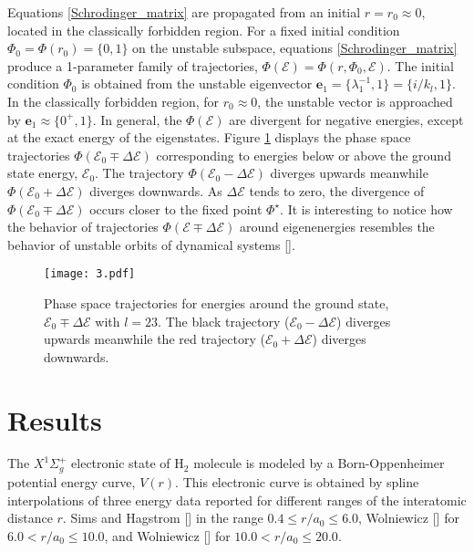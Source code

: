 \documentclass[%
 aip,
 numerical,
 jcp,
 floatfix,
rsi,%
amsmath,amssymb,
reprint,%
author-year%
]{revtex4-1}
\begin{document}
Equations \eqref{Schrodinger_matrix} are propagated from an initial $r=r_0\approx 0$, located in the classically forbidden region. For a fixed initial condition $\Phi_0=\Phi(r_0)=\{0,1\}$ on the unstable subspace, equations \eqref{Schrodinger_matrix} produce a 1-parameter family of trajectories, $\Phi(\mathcal{E})=\Phi(r,\Phi_0,\mathcal{E})$. The initial condition $\Phi_0$ is obtained from the unstable eigenvector $\mathbf{e}_1=\{\lambda_1^{-1},1\}=\{i/k_l,1\}$. In the classically forbidden region, for $r_0\approx 0$, the unstable vector is approached by $\mathbf{e}_1\approx\{0^+,1\}$. In general, the $\Phi(\mathcal{E})$ are divergent for negative energies, except at the exact energy of the eigenstates. Figure \ref{phase_space_divergence} displays the phase space trajectories $\Phi(\mathcal{E}_0\mp\Delta\mathcal{E})$ corresponding to energies below or above the ground state energy, $\mathcal{E}_0$. The trajectory $\Phi(\mathcal{E}_0-\Delta\mathcal{E})$ diverges upwards meanwhile $\Phi(\mathcal{E}_0+\Delta\mathcal{E})$ diverges downwards. As $\Delta\mathcal{E}$ tends to zero, the divergence of $\Phi(\mathcal{E}_0\mp\Delta\mathcal{E})$ occurs closer to the fixed point $\Phi^\star$. It is interesting to notice how the behavior of trajectories $\Phi(\mathcal{E}\mp\Delta\mathcal{E})$ around eigenenergies resembles the behavior of unstable orbits of dynamical systems [].

\begin{figure}[ht!]\centering
	\texttt{[image: 3.pdf]}
	\caption{Phase space trajectories for energies around the ground state, $\mathcal{E}_0\mp\Delta\mathcal{E}$ with $l=23$. The black trajectory ($\mathcal{E}_0-\Delta\mathcal{E}$) diverges upwards meanwhile the red trajectory ($\mathcal{E}_0+\Delta\mathcal{E}$) diverges downwards. }\label{phase_space_divergence}
\end{figure}
%
\section{Results}

The $X^{1}\Sigma_{g}^{+}$ electronic state of H$_{2}$ molecule is modeled by a Born-Oppenheimer potential energy curve, $V(r)$. This electronic curve is obtained by spline interpolations of three energy data reported for different ranges of the interatomic distance $r$. Sims and Hagstrom [] in the range $0.4\leq r/a_0\leq6.0$, Wolniewicz [] for $6.0< r/a_0\leq10.0$, and Wolniewicz [] for $10.0< r/a_0 \leq20.0$. 
\end{document}
